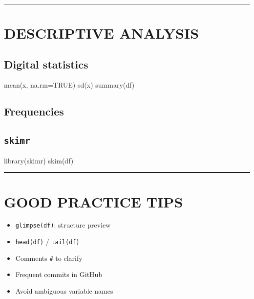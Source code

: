 \documentclass[
  8pt,
  letterpaper,
  DIV=11,
  numbers=noendperiod]{scrartcl}
\newenvironment{Shaded}{\begin{snugshade}}{\end{snugshade}}
\newcommand{\AttributeTok}[1]{\textcolor[rgb]{0.40,0.45,0.13}{#1}}
\newcommand{\ConstantTok}[1]{\textcolor[rgb]{0.56,0.35,0.01}{#1}}
\newcommand{\FunctionTok}[1]{\textcolor[rgb]{0.28,0.35,0.67}{#1}}
\newcommand{\NormalTok}[1]{\textcolor[rgb]{0.00,0.23,0.31}{#1}}
\newcommand{\SpecialCharTok}[1]{\textcolor[rgb]{0.37,0.37,0.37}{#1}}
\providecommand{\tightlist}{%
  \setlength{\itemsep}{0pt}\setlength{\parskip}{0pt}}
\begin{document}
\begin{center}\rule{0.5\linewidth}{0.5pt}\end{center}

\section{DESCRIPTIVE ANALYSIS}\label{descriptive-analysis}

\subsection{Digital statistics}\label{digital-statistics}

\begin{Shaded}
\begin{Highlighting}[]
\FunctionTok{mean}\NormalTok{(x, }\AttributeTok{na.rm=}\ConstantTok{TRUE}\NormalTok{)}
\FunctionTok{sd}\NormalTok{(x)}
\FunctionTok{summary}\NormalTok{(df)}
\end{Highlighting}
\end{Shaded}

\subsection{Frequencies}\label{frequencies}

\begin{Shaded}
\end{Shaded}

\subsection{\texorpdfstring{\texttt{skimr}}{skimr}}\label{skimr}

\begin{Shaded}
\begin{Highlighting}[]
\FunctionTok{library}\NormalTok{(skimr)}
\FunctionTok{skim}\NormalTok{(df)}
\end{Highlighting}
\end{Shaded}

\begin{center}\rule{0.5\linewidth}{0.5pt}\end{center}

\section{GOOD PRACTICE TIPS}\label{good-practice-tips}

\begin{itemize}
\tightlist
\item
  \texttt{glimpse(df)}: structure preview
\item
  \texttt{head(df)} / \texttt{tail(df)}
\item
  Comments \texttt{\#} to clarify
\item
  Frequent commits in GitHub
\item
  Avoid ambiguous variable names
\end{itemize}
\end{document}
